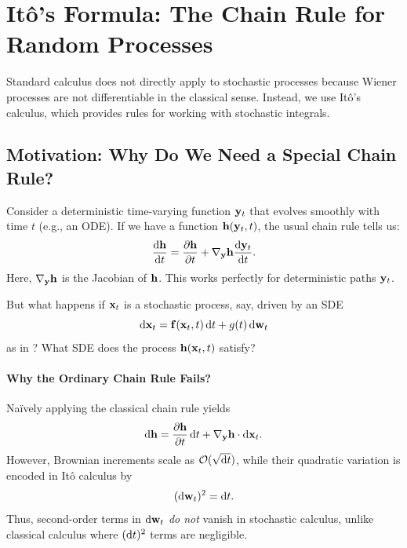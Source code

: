 \newpage


\section{It\^o's Formula: The Chain Rule for Random Processes}
Standard calculus does not directly apply to stochastic processes because Wiener processes are not differentiable in the classical sense. Instead, we use It\^o’s calculus, which provides rules for working with stochastic integrals. 

\subsection{Motivation: Why Do We Need a Special Chain Rule?}
Consider a deterministic time-varying function ${\mathbf{y}}_t$ that evolves smoothly with time $t$ (e.g., an ODE). If we have a function ${\mathbf{h}}({\mathbf{y}}_t, t)$, the usual chain rule tells us:
\[
\frac{\mathop{}\!\mathrm{d} {\mathbf{h}}}{\mathop{}\!\mathrm{d} t} = \frac{\partial {\mathbf{h}}}{\partial t}  + \nabla_{{\mathbf{y}}}{\mathbf{h}}  \frac{\mathop{}\!\mathrm{d} {\mathbf{y}}_t}{\mathop{}\!\mathrm{d} t} .
\]
Here, $\nabla_{{\mathbf{y}}}{\mathbf{h}}$ is the Jacobian of ${\mathbf{h}}$. This works perfectly for deterministic paths ${\mathbf{y}}_t$.

\begin{question}
    But what happens if ${\mathbf{x}}_t$ is a stochastic process, say, driven by an SDE 
\[
\mathop{}\!\mathrm{d} {\mathbf{x}}_t = {\mathbf{f}}({\mathbf{x}}_t, t)\mathop{}\!\mathrm{d} t + g(t) \mathop{}\!\mathrm{d} {\mathbf{w}}_t
\]
as in ? What SDE does the process ${\mathbf{h}}({\mathbf{x}}_t, t)$ satisfy?
\end{question}

\paragraph{Why the Ordinary Chain Rule Fails?}
Naïvely applying the classical chain rule yields
\[
\mathop{}\!\mathrm{d} {\mathbf{h}} = \frac{\partial {\mathbf{h}}}{\partial t} \mathop{}\!\mathrm{d} t + \nabla_{{\mathbf{y}}}{\mathbf{h}}  \cdot \mathop{}\!\mathrm{d} {\mathbf{x}}_t.
\]
However, Brownian increments scale as
$\mathcal{O}(\sqrt{\mathop{}\!\mathrm{d} t})$, while their quadratic variation is encoded
in It\^o calculus by
\[
(\mathop{}\!\mathrm{d} {\mathbf{w}}_t)^2 = \mathop{}\!\mathrm{d} t.
\]
Thus, second-order terms in $\mathop{}\!\mathrm{d} {\mathbf{w}}_t$ \textit{do not} vanish in stochastic calculus, unlike classical calculus where $(\mathop{}\!\mathrm{d} t)^2$ terms are negligible.



